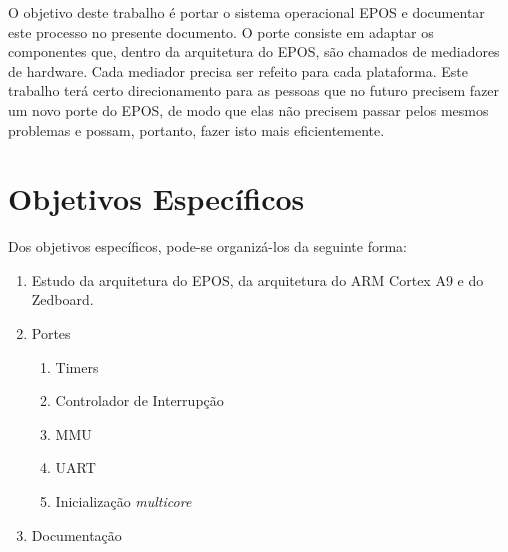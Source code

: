 O objetivo deste trabalho é portar o sistema operacional EPOS e documentar este processo no presente documento. O porte consiste em adaptar os componentes que, dentro da arquitetura do EPOS, são chamados de mediadores de hardware. Cada mediador precisa ser refeito para cada plataforma.
Este trabalho terá certo direcionamento para as pessoas que no futuro precisem fazer um novo porte do EPOS, de modo que elas não precisem passar pelos mesmos problemas e possam, portanto, fazer isto mais eficientemente.

\section{Objetivos Específicos}
Dos objetivos específicos, pode-se organizá-los da seguinte forma:

\begin{enumerate}
    \item Estudo da arquitetura do EPOS, da arquitetura do ARM Cortex A9 e do Zedboard.
    \item Portes
    \begin{enumerate}
        \item Timers
        \item Controlador de Interrupção
        \item MMU
		\item UART
		\item Inicialização \emph{multicore}
    \end{enumerate}
    \item Documentação
\end{enumerate}
